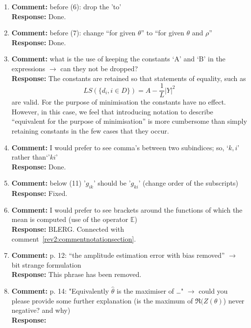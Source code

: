 \documentclass{article}
\newcommand{\abs}[1]{{\left\vert #1 \right\vert}}
\begin{document}
\begin{enumerate}
\item \textbf{Comment:} before (6): drop the 'to' \\
\textbf{Response:} Done.

\item \textbf{Comment:} before (7): change ``for given $\theta$'' to ``for given $\theta$ and $\rho$'' \\
\textbf{Response:} Done.

\item \textbf{Comment:} what is the use of keeping the constants `A' and `B' in the expressions $\to$ can they not be dropped? \\
\textbf{Response:} The constants are retained so that statements of equality, such as
\[
LS(\{d_i, i \in D\}) = A - \frac{1}{L}\abs{Y}^2
\]
are valid. For the purpose of minimisation the constants have no effect.  However, in this case, we feel that introducing notation to describe ``equivalent for the purpose of minimisation'' is more cumbersome than simply retaining constants in the few cases that they occur.

\item \textbf{Comment:} I would prefer to see comma's between two subindices; so, `$k,i$' rather than`'$ki$' \\
\textbf{Response:} Done.

\item \textbf{Comment:} below (11) '$g_{ik}$' should be '$g_{ki}$' (change order of the subscripts) \\
\textbf{Response:} Fixed.

\item \label{rev2:commentE} \textbf{Comment:} I would prefer to see brackets around the functions of which the mean is computed (use of the operator $\mathbb E$) \\
\textbf{Response:} BLERG.  Connected with comment~\ref{rev2:commentnotationsection}.

\item \textbf{Comment:} p. 12: ``the amplitude estimation error with bias removed'' $\to$ bit strange formulation \\
\textbf{Response:} This phrase has been removed.

\item \textbf{Comment:} p. 14: "Equivalently $\hat\theta$ is the maximiser of \dots" $\to$ could you please provide some further explanation (is the maximum of $\Re(Z(\theta)$) never negative? and why) \\
\textbf{Response:}


\end{enumerate}
\end{document}
